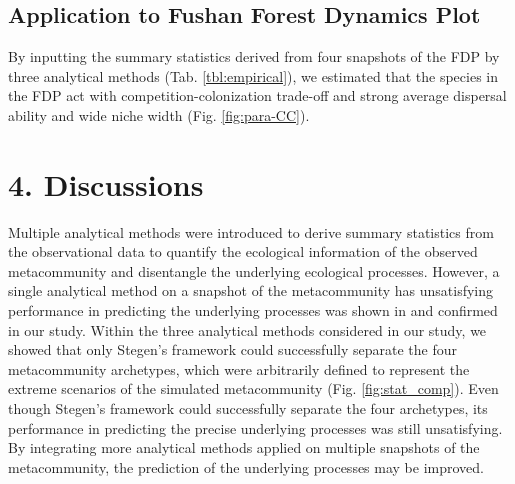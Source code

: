 \section{Application to Fushan Forest Dynamics Plot}
\noindent
By inputting the summary statistics derived from four snapshots of the FDP by three analytical methods (Tab. \ref{tbl:empirical}), we estimated that the species in the FDP act with competition-colonization trade-off and strong average dispersal ability and wide niche width (Fig. \ref{fig:para-CC}). 

%

\newpage
\chapter*{4. Discussions}
\setcounter{chapter}{4}
\noindent
Multiple analytical methods were introduced to derive summary statistics from the observational data to quantify the ecological information of the observed metacommunity and disentangle the underlying ecological processes. However, a single analytical method on a snapshot of the metacommunity has unsatisfying performance in predicting the underlying processes was shown in \citet{guzman2022accounting} and confirmed in our study. Within the three analytical methods considered in our study, we showed that only Stegen's framework could successfully separate the four metacommunity archetypes, which were arbitrarily defined to represent the extreme scenarios of the simulated metacommunity (Fig. \ref{fig:stat_comp}). Even though Stegen's framework could successfully separate the four archetypes, its performance in predicting the precise underlying processes was still unsatisfying. By integrating more analytical methods applied on multiple snapshots of the metacommunity, the prediction of the underlying processes may be improved. 

